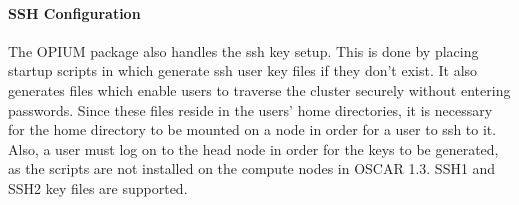 \paragraph{SSH Configuration}

The OPIUM package also handles the ssh key setup.  This is done by placing
startup scripts in  which generate ssh user key files if 
they don't exist.  It also generates  files which enable
users to traverse the cluster securely without entering passwords.  Since
these files reside in the users' home directories, it is necessary for
the home directory to be mounted on a node in order for a user to ssh to
it.  Also, a user must log on to the head node in order for the keys to
be generated, as the  scripts are not installed on the
compute nodes in OSCAR 1.3.  SSH1 and SSH2 key files are supported.  

